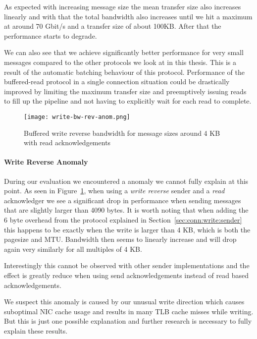 As expected with increasing message size the mean transfer size also increases linearly and with that the 
total bandwidth also increases until we hit a maximum at around 70 Gbit/s and a transfer size of about 100KB. After that 
the performance starts to degrade. 

We can also see that we achieve significantly better performance for very small messages compared to the other protocols we
look at in this thesis. This is a result of the automatic batching behaviour of this protocol. 
Performance of the buffered-read
protocol in a single connection situation could be drastically improved by limiting the maximum transfer size and 
preemptively issuing reads to fill up the pipeline and not having to explicitly wait for each
read to complete.


\begin{figure}[h]
\texttt{[image: write-bw-rev-anom.png]}
\caption{Buffered write reverse bandwidth for message sizes around 4 KB with read acknowledgements}
\label{fig:plot-write-rev-anom}
\end{figure}

\paragraph{Write Reverse Anomaly} During our evaluation we encountered a anomaly we cannot fully explain at
this point. As seen in Figure~\ref{fig:plot-write-rev-anom}, when using a \emph{write reverse} sender and a 
\emph{read} acknowledger we see a significant drop in performance when sending messages that are slightly larger
than 4090 bytes. It is worth noting that when adding the 6 byte overhead from the protocol explained in 
Section~\ref{sec:conn:write:sender} this happens to be exactly when the write is larger than 4 KB, 
which is both the pagesize and MTU. Bandwidth then seems to linearly increase and will drop again very similarly 
for all multiples of 4 KB.

Interestingly this cannot be observed with other sender implementations and the effect is greatly
reduce when using send acknowledgements instead of read based acknowledgements.

We suspect this anomaly is caused by our unusual write direction which causes suboptimal NIC cache usage and 
results in many TLB cache misses while writing. But this is just one possible explanation and further research is 
necessary to fully explain these results.

